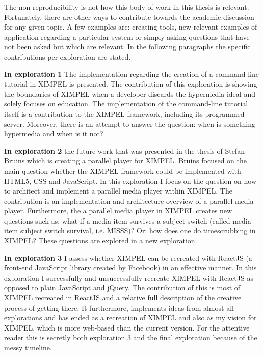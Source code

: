 The non-reproducibility is not how this body of work in this thesis is relevant. Fortunately, there are other ways to contribute towards the academic discussion for any given topic. A few examples are: creating tools, new relevant examples of application regarding a particular system or simply asking questions that have not been asked but which are relevant. In the following paragraphs the specific contributions per exploration are stated.

\textbf{In exploration 1} The implementation regarding the creation of a command-line tutorial in XIMPEL is presented. The contribution of this exploration is showing the boundaries of XIMPEL when a developer discards the hypermedia ideal and solely focuses on education. The implementation of the command-line tutorial itself is a contribution to the XIMPEL framework, including its programmed server. Moreover, there is an attempt to answer the question: when is something hypermedia and when is it not?

\textbf{In exploration 2} the future work that was presented in the thesis of Stefan Bruins\cite{stefan2016} which is creating a parallel player for XIMPEL. Bruins focused on the main question whether the XIMPEL framework could be implemented with HTML5, CSS and JavaScript. In this exploration I focus on the question on how to architect and implement a parallel media player within XIMPEL. The contribution is an implementation and architecture overview of a parallel media player. Furthermore, the a parallel media player in XIMPEL creates new questions such as: what if a media item survives a subject switch (called media item subject switch survival, i.e. MISSS)? Or: how does one do timescrubbing in XIMPEL? These questions are explored in a new exploration.

\textbf{In exploration 3} I assess whether XIMPEL can be recreated with ReactJS (a front-end JavaScript library created by Facebook) in an effective manner. In this exploration I successfully and unsuccessfully recreate XIMPEL with ReactJS as opposed to plain JavaScript and jQuery. The contribution of this is most of XIMPEL recreated in ReactJS and a relative full description of the creative process of getting there. It furthermore, implements ideas from almost all explorations and has ended as a recreation of XIMPEL and also as my vision for XIMPEL, which is more web-based than the current version. For the attentive reader this is secretly both exploration 3 and the final exploration because of the messy timeline.

